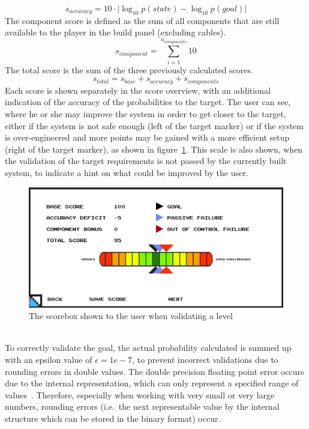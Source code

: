\begin{equation}
    s_{accuracy} = 10 \cdot \lvert \log_{10} p(state) - \log_{10} p(goal)\rvert
    \label{eq:accuracy-score}
\end{equation}
The component score is defined as the sum of all components that are still available to the player in the build panel (excluding cables).
\begin{equation}
    s_{component} = \sum_{i = 1}^{n_{components}} 10
    \label{eq:component-score}
\end{equation}
The total score is the sum of the three previously calculated scores.
\begin{equation}
    s_{total} = s_{base} + s_{accuracy} + s_{components}
    \label{eq:total-score}
\end{equation}
Each score is shown separately in the score overview, with an additional indication of the accuracy of the probabilities to the target.
The user can see, where he or she may improve the system in order to get closer to the target, either if the system is not safe enough (left of
the target marker) or if the system is over-engineered and more points may be gained with a more efficient setup (right of the target marker), as shown
in figure~\ref{fig:score}.
This scale is also shown, when the validation of the target requirements is not passed by the currently built system, to indicate
a hint on what could be improved by the user.
\begin{figure}
    \centering
    \includegraphics[width=\textwidth]{Pictures/res/implementation/scenes/scorebox}
    \caption{The scorebox shown to the user when validating a level}
    \label{fig:score}
\end{figure}
\\
To correctly validate the goal, the actual probability calculated is summed up with an epsilon value of $\epsilon = 1e-7$,
to prevent incorrect validations due to rounding errors in double values.
The double precision floating point error occurs due to the internal representation, which can only represent a specified range of
values~\cite{floating-point}.
Therefore, especially when working with very small or very large numbers, rounding errors (i.e.\ the next representable value by the internal structure which can be stored
in the binary format) occur.
